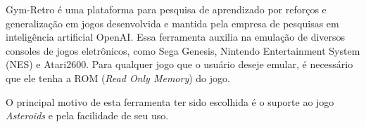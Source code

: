 Gym-Retro é uma plataforma para pesquisa de aprendizado por reforços e generalização em jogos desenvolvida e mantida pela empresa de pesquisas em inteligência artificial OpenAI. Essa ferramenta auxilia na emulação de diversos consoles de jogos eletrônicos, como Sega Genesis, Nintendo Entertainment System (NES) e Atari2600. Para qualquer jogo que o usuário deseje emular, é necessário que ele tenha a ROM (\textit{Read Only Memory}) do jogo.

O principal motivo de esta ferramenta ter sido escolhida é o suporte ao jogo \textit{Asteroids} e pela facilidade de seu uso.

